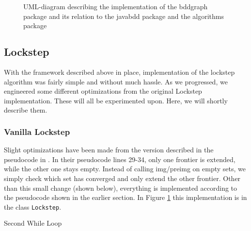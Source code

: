 \documentclass[../master/master.tex]{subfiles}
\begin{document}
\begin{figure}[H]
\begin{center}
\end{center}
\caption{UML-diagram describing the implementation of the bddgraph package and its relation to the javabdd package and the algorithms package}
\label{main_uml}
\end{figure}

\subsection{Lockstep}
With the framework described above in place, implementation of the lockstep algorithm was fairly simple and without much hassle. As we progressed, we engineered some different optimizations from the original Lockstep implementation. These will all be experimented upon. Here, we will shortly describe them.

\subsubsection{Vanilla Lockstep}
Slight optimizations have been made from the version described in the pseudocode in \cite{lockstep}. In their pseudocode \cite[p.~45]{lockstep} lines 29-34, only one frontier is extended, while the other one stays empty. Instead of calling img/preimg on empty sets, we simply check which set has converged and only extend the other frontier.
Other than this small change (shown below), everything is implemented according to the pseudocode shown in the earlier section. In Figure \ref{main_uml} this implementation is in the class \texttt{Lockstep}.

\begin{algorithm}[H]
  \caption{Second While Loop}
  \begin{algorithmic}
      \EndWhile
      \Else
      \EndWhile
    \EndIf
  \end{algorithmic}
\end{algorithm}
\end{document}
